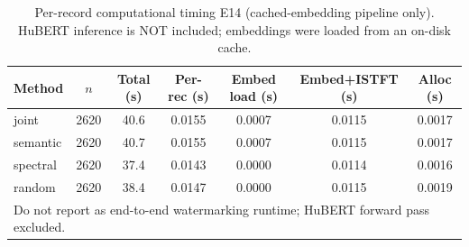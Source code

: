 \begin{table}[t]
\centering
\caption{Per-record computational timing E14 (cached-embedding pipeline only). HuBERT inference is NOT included; embeddings were loaded from an on-disk cache.}
\label{tab:compute-e14}
\scriptsize
\begin{tabular}{lcccccc}
\toprule
\textbf{Method} & \textbf{$n$} & \textbf{Total (s)} & \textbf{Per-rec (s)} & \textbf{Embed load (s)} & \textbf{Embed+ISTFT (s)} & \textbf{Alloc (s)} \\
\midrule
joint & 2620 & 40.6 & 0.0155 & 0.0007 & 0.0115 & 0.0017 \\
semantic & 2620 & 40.7 & 0.0155 & 0.0007 & 0.0115 & 0.0017 \\
spectral & 2620 & 37.4 & 0.0143 & 0.0000 & 0.0114 & 0.0016 \\
random & 2620 & 38.4 & 0.0147 & 0.0000 & 0.0115 & 0.0019 \\
\bottomrule
\multicolumn{7}{l}{\footnotesize Do not report as end-to-end watermarking runtime; HuBERT forward pass excluded.}\\
\end{tabular}
\end{table}
